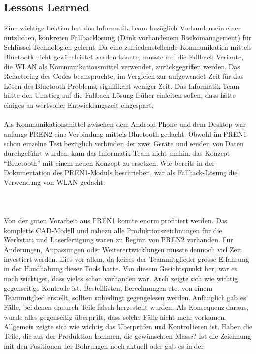 \subsection{Lessons Learned}
Eine wichtige Lektion hat das Informatik-Team bezüglich Vorhandensein einer nützlichen, 
konkreten Fallbacklösung (Dank vorhandenem Risikomanagement) für Schlüssel Technologien gelernt. 
Da eine zufriedenstellende Kommunikation mittels Bluetooth nicht gewährleistet werden konnte, 
musste auf die Fallback-Variante, die WLAN als Kommunikationsmittel verwendet, zurückgegriffen werden. 
Das Refactoring des Codes beanspruchte, im Vergleich zur aufgewendet Zeit für das Lösen des Bluetooth-Problems, 
signifikant weniger Zeit. Das Informatik-Team hätte den Umstieg auf die Fallback-Lösung früher einleiten sollen, 
dass hätte einiges an wertvoller Entwicklungszeit eingespart.
\\
\\
Als Kommunikationsmittel zwischen dem Android-Phone und dem Desktop war anfangs PREN2 eine Verbindung 
mittels Bluetooth gedacht. Obwohl im PREN1 schon einzelne Test bezüglich verbinden der zwei Geräte und 
senden von Daten durchgeführt wurden, kam das Informatik-Team nicht umhin, das Konzept \enquote{Bluetooth} mit einem neuen 
Konzept zu ersetzen. Wie bereits in der Dokumentation des PREN1-Moduls beschrieben, war als Fallback-Lösung 
die Verwendung von WLAN gedacht. 
\\
\\

\\
\\
Von der guten Vorarbeit aus PREN1 konnte enorm profitiert werden. Das komplette CAD-Modell und 
nahezu alle Produktionszeichnungen für die Werkstatt und Laserfertigung waren zu Beginn von PREN2 vorhanden. 
Für Änderungen, Anpassungen oder Weiterentwicklungen musste dennoch viel Zeit investiert werden. 
Dies vor allem, da keines der Teammitglieder grosse Erfahrung in der Handhabung dieser Tools hatte. 
Von diesem Gesichtspunkt her, war es noch wichtiger, dass vieles schon vorhanden war. Auch zeigte sich wie 
wichtig gegenseitige Kontrolle ist. Bestelllisten, Berechnungen etc. von einem Teammitglied erstellt, sollten 
unbedingt gegengelesen werden. Anfänglich gab es Fälle, bei denen dadurch Teile falsch hergestellt wurden. 
Als Konsequenz daraus, wurde alles gegenseitig überprüft, dass solche Fälle nicht mehr vorkamen. Allgemein 
zeigte sich wie wichtig das Überprüfen und Kontrollieren ist. Haben die Teile, die aus der Produktion kommen, 
die gewünschten Masse? Ist die Zeichnung mit den Positionen der Bohrungen noch aktuell oder gab es in der 
